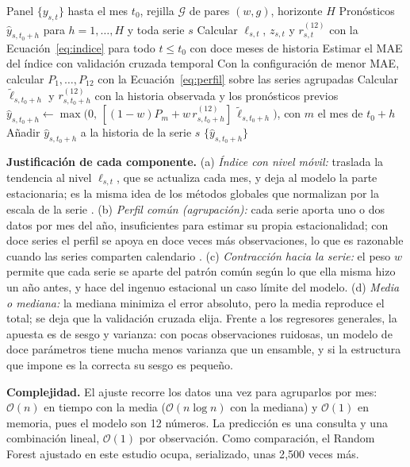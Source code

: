 \documentclass[pdflatex,sn-mathphys-num]{sn-jnl}
\begin{document}
\begin{algorithm}
\caption{Perfil estacional global contraído y proyección recursiva}\label{alg:propuesto}
\begin{algorithmic}[1]
\Require Panel $\{y_{s,t}\}$ hasta el mes $t_0$, rejilla $\mathcal{G}$ de pares $(w,g)$, horizonte $H$
\Ensure Pronósticos $\hat{y}_{s,t_0+h}$ para $h=1,\dots,H$ y toda serie $s$
\State Calcular $\ell_{s,t}$, $z_{s,t}$ y $r^{(12)}_{s,t}$ con la Ecuación~\eqref{eq:indice} para todo $t\le t_0$ con doce meses de historia
    \State Estimar el MAE del índice con validación cruzada temporal
\EndFor
\State Con la configuración de menor MAE, calcular $P_1,\dots,P_{12}$ con la Ecuación~\eqref{eq:perfil} sobre las series agrupadas
    \State Calcular $\tilde{\ell}_{s,t_0+h}$ y $r^{(12)}_{s,t_0+h}$ con la historia observada y los pronósticos previos
    \State $\hat{y}_{s,t_0+h}\gets\max\bigl(0,\,[(1-w)P_{m}+w\,r^{(12)}_{s,t_0+h}]\,\tilde{\ell}_{s,t_0+h}\bigr)$, con $m$ el mes de $t_0+h$
    \State Añadir $\hat{y}_{s,t_0+h}$ a la historia de la serie $s$
\EndFor
\State \Return $\{\hat{y}_{s,t_0+h}\}$
\end{algorithmic}
\end{algorithm}

\textbf{Justificación de cada componente.} (a) \emph{Índice con nivel móvil:} traslada la tendencia al nivel $\ell_{s,t}$, que se actualiza cada mes, y deja al modelo la parte estacionaria; es la misma idea de los métodos globales que normalizan por la escala de la serie \cite{salinas2020,smyl2020}. (b) \emph{Perfil común (agrupación):} cada serie aporta uno o dos datos por mes del año, insuficientes para estimar su propia estacionalidad; con doce series el perfil se apoya en doce veces más observaciones, lo que es razonable cuando las series comparten calendario \cite{monteromanso2021}. (c) \emph{Contracción hacia la serie:} el peso $w$ permite que cada serie se aparte del patrón común según lo que ella misma hizo un año antes, y hace del ingenuo estacional un caso límite del modelo. (d) \emph{Media o mediana:} la mediana minimiza el error absoluto, pero la media reproduce el total; se deja que la validación cruzada elija. Frente a los regresores generales, la apuesta es de sesgo y varianza: con pocas observaciones ruidosas, un modelo de doce parámetros tiene mucha menos varianza que un ensamble, y si la estructura que impone es la correcta su sesgo es pequeño.

\textbf{Complejidad.} El ajuste recorre los datos una vez para agruparlos por mes: $\mathcal{O}(n)$ en tiempo con la media ($\mathcal{O}(n\log n)$ con la mediana) y $\mathcal{O}(1)$ en memoria, pues el modelo son 12 números. La predicción es una consulta y una combinación lineal, $\mathcal{O}(1)$ por observación. Como comparación, el Random Forest ajustado en este estudio ocupa, serializado, unas 2{,}500 veces más.
\end{document}
